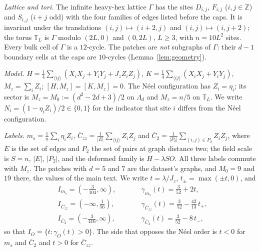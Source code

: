 \documentclass[aps,prx,onecolumn,10pt,nofootinbib,longbibliography,floatfix]{revtex4-2}
\theoremstyle{remark}
\newcommand{\Jz}{J_z}
\newcommand{\ms}{m_s}
\newcommand{\Czz}{\bar C_{zz}}
\newcommand{\Ctwo}{\bar C_{2}}
\begin{document}
\emph{Lattice and tori.} The infinite heavy-hex lattice $\Gamma$ has the sites $D_{i,j}$, $F_{i,j}$ ($i,j\in\mathbb Z$)
and $S_{i,j}$ ($i+j$ odd) with the four families of edges listed before the caps. It is invariant under the translations
$(i,j)\mapsto(i+2,j)$ and $(i,j)\mapsto(i,j+2)$; the torus $\mathbb T_L$ is $\Gamma$ modulo $(2L,0)$ and $(0,2L)$,
$L\ge3$, with $n=10L^2$ sites. Every bulk cell of $\Gamma$ is a $12$-cycle. The patches are \emph{not} subgraphs of %
$\Gamma$: their $d-1$ boundary cells at the caps are $10$-cycles (Lemma~\ref{lem:geometry}). %

\emph{Model.} $H=\frac14\sum_{\langle ij\rangle}(X_iX_j+Y_iY_j+\Jz Z_iZ_j)$, $K=\frac14\sum_{\langle ij\rangle}(X_iX_j+Y_iY_j)$,
$M_z=\sum_iZ_i$; $[H,M_z]=[K,M_z]=0$. The N\'eel configuration has $Z_i=\eta_i$; its sector is $M_z=M_0:=(d^2-2d+3)/2$ on
$\Lambda_d$ and $M_z=n/5$ on $\mathbb T_L$. We write $N_i=(1-\eta_iZ_i)/2\in\{0,1\}$ for the indicator that site $i$
differs from the N\'eel configuration.

\emph{Labels.} $\ms=\frac1n\sum_i\eta_iZ_i$, $\Czz=\frac1{|E|}\sum_{\langle ij\rangle}Z_iZ_j$ and
$\Ctwo=\frac1{|P_2|}\sum_{(i,j)\in P_2}Z_iZ_j$, where $E$ is the set of edges and $P_2$ the set of pairs at graph
distance two; the field scale is $S=n$, $|E|$, $|P_2|$, and the deformed family is $H-\lambda SO$. All three labels
commute with $M_z$. The patches with $d=5$ and $7$ are the dataset's graphs, and $M_0=9$ and $19$ there, the %
values of the main text. We write $t=\lambda/\Jz$, $t_\pm=\max(\pm t,0)$, and
\begin{equation}
\begin{aligned}
&I_{\ms}=(-\tfrac{3}{104},\infty), &\qquad&\gamma_{\ms}(t)=\tfrac{3}{52}+2t,\\ %
&I_{\Czz}=(-\infty,\tfrac{1}{56}), &&\gamma_{\Czz}(t)=\tfrac{3}{52}-\tfrac{42}{13}\,t_+,\\ %
&I_{\Ctwo}=(-\tfrac{3}{416},\infty), &&\gamma_{\Ctwo}(t)=\tfrac{3}{52}-8\,t_- , %
\end{aligned}
\label{eq:windows}
\end{equation}
so that $I_O=\{t:\gamma_O(t)>0\}$. The side that opposes the N\'eel order is $t<0$ for $\ms$ and $\Ctwo$ and $t>0$
for $\Czz$.
\end{document}
